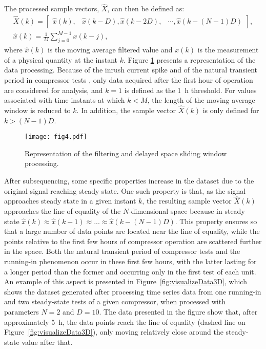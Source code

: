 \documentclass[preprint,11pt,number]{elsarticle}
\begin{document}
The processed sample vectors, $\hat{X}$, can then be defined as:
\begin{equation} \label{eq:vectorSliding}
    \begin{gathered}
    \hat{X}(k) = \left[\begin{matrix} 
    \hat{x}(k), & \hat{x}(k-D), \hat{x}(k-2D), & \cdots,\hat{x}(k-(N-1)D)
    \end{matrix}\right], \\
    \hat{x}(k) = \frac{1}{M}\sum\limits_{j=0}^{M-1} x(k-j),
\end{gathered}
\end{equation}
%
\noindent where $\hat{x}(k)$ is the moving average filtered value and $x(k)$ is the measurement of a physical quantity at the instant $k$. \color{red} Figure \ref{fig:dataProcess} presents a representation of the data processing. \color{black} Because of the inrush current spike and of the natural transient period in compressor tests \cite{Coral2019}, only data acquired after the first hour of operation are considered for analysis, and $k = 1$ is defined as the \SI{1}{\hour} threshold. For values associated with time instants at which $k<M$, the length of the moving average window is reduced to $k$. In addition, the sample vector $\hat{X}(k)$ is only defined for $k>(N-1)D$.

\begin{figure}[htb]
\begin{center}
\texttt{[image: fig4.pdf]}    %
\color{red}
\caption{Representation of the filtering and delayed space sliding window processing.}
\label{fig:dataProcess}
\end{center}
\end{figure}

After subsequencing, some specific properties increase in the dataset due to the original signal reaching steady state. One such property is that, as the signal approaches steady state in a given instant $k$, the resulting sample vector $\hat{X}(k)$ approaches the line of equality of the $N$-dimensional space because in steady state $\hat{x}(k) \approx \hat{x}(k-1) \approx ... \approx \hat{x}(k-(N-1)D)$. This property ensures so that a large number of data points are located near the line of equality, while the points relative to the first few hours of compressor operation are scattered further in the space. Both the natural transient period of compressor tests and the running-in phenomenon occur in these first few hours, with the latter lasting for a longer period than the former and occurring only in the first test of each unit. An example of this aspect is presented in Figure~\ref{fig:visualizeData3D}, which shows the dataset generated after processing time series data from one running-in and two steady-state tests of a given compressor, when processed with parameters $N=2$ and $D=10$. The data presented in the figure show that, after approximately \SI{5}{\hour}, the data points reach the line of equality (dashed line on Figure~\ref{fig:visualizeData3D}), only moving relatively close around the steady-state value after that.
\end{document}
